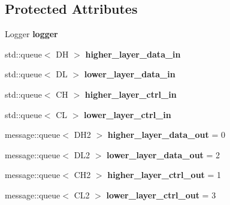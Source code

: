 \subsection*{Protected Attributes}
\begin{DoxyCompactItemize}
\item 
Logger {\bfseries logger}\hypertarget{classLayer_a537a1e57d0e9b69c857a89372e43e8c8}{}\label{classLayer_a537a1e57d0e9b69c857a89372e43e8c8}

\item 
std\+::queue$<$ DH $>$ {\bfseries higher\+\_\+layer\+\_\+data\+\_\+in}\hypertarget{classLayer_a087dc6b9f1a13ab134ec21bbcca1613a}{}\label{classLayer_a087dc6b9f1a13ab134ec21bbcca1613a}

\item 
std\+::queue$<$ DL $>$ {\bfseries lower\+\_\+layer\+\_\+data\+\_\+in}\hypertarget{classLayer_adb48b09eff4b15662593a8e5d6c937da}{}\label{classLayer_adb48b09eff4b15662593a8e5d6c937da}

\item 
std\+::queue$<$ CH $>$ {\bfseries higher\+\_\+layer\+\_\+ctrl\+\_\+in}\hypertarget{classLayer_a2ad38a89f17ce5ce6027cf9847f42f04}{}\label{classLayer_a2ad38a89f17ce5ce6027cf9847f42f04}

\item 
std\+::queue$<$ CL $>$ {\bfseries lower\+\_\+layer\+\_\+ctrl\+\_\+in}\hypertarget{classLayer_ac4cd7792653eab48d3b01a087ae9069a}{}\label{classLayer_ac4cd7792653eab48d3b01a087ae9069a}

\item 
message\+::queue$<$ D\+H2 $>$ {\bfseries higher\+\_\+layer\+\_\+data\+\_\+out} = 0\hypertarget{classLayer_a0695544b96e2e6f4473838d1ce79acea}{}\label{classLayer_a0695544b96e2e6f4473838d1ce79acea}

\item 
message\+::queue$<$ D\+L2 $>$ {\bfseries lower\+\_\+layer\+\_\+data\+\_\+out} = 2\hypertarget{classLayer_aed13b723a43c0e7e3e05cf9c25eef0ff}{}\label{classLayer_aed13b723a43c0e7e3e05cf9c25eef0ff}

\item 
message\+::queue$<$ C\+H2 $>$ {\bfseries higher\+\_\+layer\+\_\+ctrl\+\_\+out} = 1\hypertarget{classLayer_a135be5c42313bff23a18d1cda136f495}{}\label{classLayer_a135be5c42313bff23a18d1cda136f495}

\item 
message\+::queue$<$ C\+L2 $>$ {\bfseries lower\+\_\+layer\+\_\+ctrl\+\_\+out} = 3\hypertarget{classLayer_a5fdb4f5acc54930faa871a4fdc6ce688}{}\label{classLayer_a5fdb4f5acc54930faa871a4fdc6ce688}


\end{DoxyCompactItemize}
